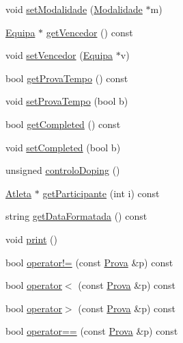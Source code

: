 \begin{DoxyCompactItemize}
\item 
void \hyperlink{class_prova_aef40e220eca46c4fabc0a27b67768e3e}{set\+Modalidade} (\hyperlink{class_modalidade}{Modalidade} $\ast$m)
\item 
\hyperlink{class_equipa}{Equipa} $\ast$ \hyperlink{class_prova_a64d0727625b43e4382e4806c032b2868}{get\+Vencedor} () const 
\item 
void \hyperlink{class_prova_a97b48c140227e28e5a472f7b7bcedd07}{set\+Vencedor} (\hyperlink{class_equipa}{Equipa} $\ast$v)
\item 
bool \hyperlink{class_prova_a88b8cc8150bb374039a701a37101fbef}{get\+Prova\+Tempo} () const 
\item 
void \hyperlink{class_prova_a0da4444f80f52ff473e2b035b1048476}{set\+Prova\+Tempo} (bool b)
\item 
bool \hyperlink{class_prova_a5f36832ceb6a8870f5f005cc2ceb5dd2}{get\+Completed} () const 
\item 
void \hyperlink{class_prova_a54eae0a267369ea33421d72418597386}{set\+Completed} (bool b)
\item 
unsigned \hyperlink{class_prova_a3615c7f67f37923abdf945e96f8eadd9}{controlo\+Doping} ()
\item 
\hyperlink{class_atleta}{Atleta} $\ast$ \hyperlink{class_prova_a34d362f2cfa3c77966e0644203aae796}{get\+Participante} (int i) const 
\item 
string \hyperlink{class_prova_ae170e53e9684644c4cfb5c864413a8b7}{get\+Data\+Formatada} () const 
\item 
void \hyperlink{class_prova_a7bb057ccef0b2b0be425cecc6ab6545e}{print} ()
\item 
bool \hyperlink{class_prova_ac608abbae0c1d4504db2b387e73dfbd6}{operator!=} (const \hyperlink{class_prova}{Prova} \&p) const 
\item 
bool \hyperlink{class_prova_a9ff163a077c304f0640a78cd384d724f}{operator$<$} (const \hyperlink{class_prova}{Prova} \&p) const 
\item 
bool \hyperlink{class_prova_ac357ed8e8138867b181cf4a146d379ee}{operator$>$} (const \hyperlink{class_prova}{Prova} \&p) const 
\item 
bool \hyperlink{class_prova_a3507b1045d13a0bc124c6d8ba36f0e24}{operator==} (const \hyperlink{class_prova}{Prova} \&p) const 
\end{DoxyCompactItemize}
